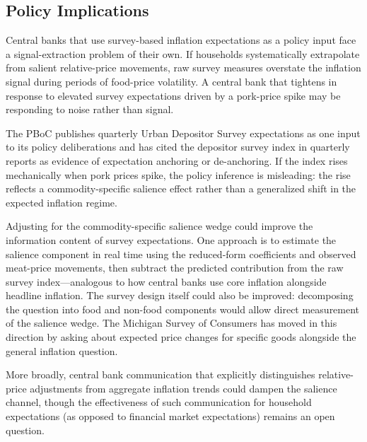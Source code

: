 \subsection{Policy Implications}\label{sec:policy}

Central banks that use survey-based inflation expectations
as a policy input face a signal-extraction problem of their
own.
If households systematically extrapolate from salient
relative-price movements, raw survey measures overstate the
inflation signal during periods of food-price volatility.
A central bank that tightens in response to elevated survey
expectations driven by a pork-price spike may be responding
to noise rather than signal.

The PBoC publishes quarterly Urban Depositor Survey
expectations as one input to its policy deliberations and
has cited the depositor survey index in quarterly reports
as evidence of expectation anchoring or de-anchoring.
If the index rises mechanically when pork prices spike,
the policy inference is misleading: the rise reflects a
commodity-specific salience effect rather than a generalized
shift in the expected inflation regime.

Adjusting for the commodity-specific salience wedge could
improve the information content of survey expectations.
One approach is to estimate the salience component in real
time using the reduced-form coefficients and observed
meat-price movements, then subtract the predicted contribution
from the raw survey index---analogous to how central banks
use core inflation alongside headline inflation.
The survey design itself could also be improved: decomposing
the question into food and non-food components would allow
direct measurement of the salience wedge.
The Michigan Survey of Consumers has moved in this direction
by asking about expected price changes for specific goods
alongside the general inflation question.

More broadly, central bank communication that explicitly
distinguishes relative-price adjustments from aggregate
inflation trends could dampen the salience channel, though
the effectiveness of such communication for household
expectations (as opposed to financial market expectations)
remains an open question.
